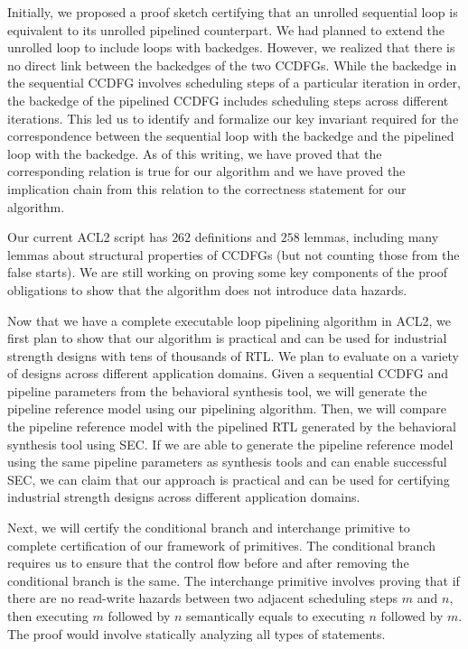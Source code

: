 Initially, we proposed a proof sketch certifying that an unrolled sequential loop is equivalent to its unrolled pipelined counterpart. We had planned to extend the unrolled loop to include loops with backedges. However, we realized that there is no direct link between the backedges of the two CCDFGs. While the backedge in the sequential CCDFG involves scheduling steps of a particular iteration in order, the backedge of the pipelined CCDFG includes scheduling steps across different iterations. This led us to identify and formalize our key invariant required for the correspondence between the sequential loop with the backedge and the pipelined loop with the backedge. As of this writing, we have proved that the corresponding relation is true for our algorithm and we have proved the implication chain from this relation to the correctness statement for our algorithm.

Our current ACL2 script has $262$
definitions and $258$ lemmas, including many lemmas about
structural properties of CCDFGs (but not counting those from the false
starts). We are still working on proving some key components of
the proof obligations to show that the algorithm does not
introduce data hazards.

Now that we have a complete executable loop pipelining algorithm in ACL2, we first plan to show that our algorithm is practical and can be used for industrial strength designs with tens of thousands of RTL. We plan to evaluate on a variety of designs across different application domains. Given a sequential CCDFG and pipeline parameters from the behavioral synthesis tool, we will generate the pipeline reference model using our pipelining algorithm. Then, we will compare the pipeline reference model with the pipelined RTL generated by the behavioral synthesis tool using SEC. If we are able to generate the pipeline reference model using the same pipeline parameters as synthesis tools and can enable successful SEC, we can claim that our approach is practical and can be used for certifying industrial strength designs across different application domains.

Next, we will certify the conditional branch and interchange primitive to complete certification of our framework of primitives. The conditional branch requires us to ensure that the control flow before and after removing the conditional branch is the same. The interchange primitive involves proving that if there are no read-write hazards between two adjacent scheduling steps $m$ and $n$, then executing $m$ followed by $n$ semantically equals to executing $n$ followed by $m$. The proof would involve statically analyzing all types of statements.

